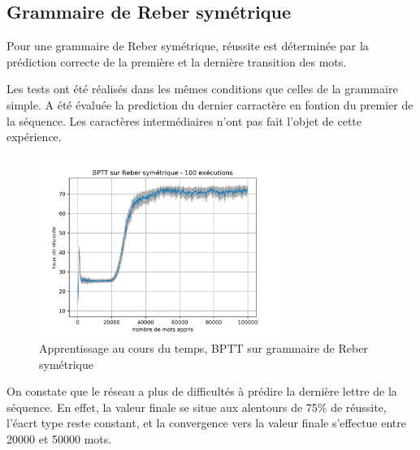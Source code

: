 \subsection{Grammaire de Reber symétrique}
Pour une grammaire de Reber symétrique, réussite est déterminée par la prédiction
correcte de la première et la dernière transition des mots.

\medskip

Les tests ont été réalisés dans les mêmes conditions que celles de la grammaire
simple. A été évaluée la prediction du dernier carractère en fontion du premier
de la séquence. Les caractères intermédiaires n'ont pas fait l'objet de cette
expérience.

\begin{figure}[!ht]
\begin{center}
\includegraphics[width=0.7\textwidth]{images/results/bptt_doublereber_ls30_lr01.png}
\caption{Apprentissage au cours du temps, BPTT sur grammaire de Reber symétrique}
\end{center}
\end{figure}

\medskip

On constate que le réseau a plus de difficultés à prédire la dernière lettre de
la séquence. En effet, la valeur finale se situe aux alentours de 75\% de
réussite, l'éacrt type reste constant, et la convergence vers la valeur finale
s'effectue entre 20000 et 50000 mots.
